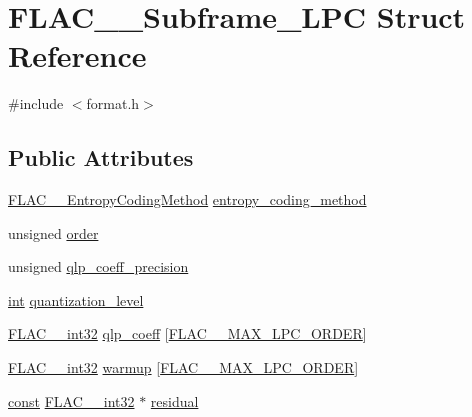 \hypertarget{struct_f_l_a_c_____subframe___l_p_c}{}\section{F\+L\+A\+C\+\_\+\+\_\+\+Subframe\+\_\+\+L\+PC Struct Reference}
\label{struct_f_l_a_c_____subframe___l_p_c}


{\ttfamily \#include $<$format.\+h$>$}

\subsection*{Public Attributes}
\begin{DoxyCompactItemize}
\item 
\hyperlink{struct_f_l_a_c_____entropy_coding_method}{F\+L\+A\+C\+\_\+\+\_\+\+Entropy\+Coding\+Method} \hyperlink{struct_f_l_a_c_____subframe___l_p_c_adb1401b2f8af05132420145a99f68c6e}{entropy\+\_\+coding\+\_\+method}
\item 
unsigned \hyperlink{struct_f_l_a_c_____subframe___l_p_c_a0de317accaf8a9f86194f97c378b2f86}{order}
\item 
unsigned \hyperlink{struct_f_l_a_c_____subframe___l_p_c_a6123b031203f603eba966b95fd2ad855}{qlp\+\_\+coeff\+\_\+precision}
\item 
\hyperlink{xmltok_8h_a5a0d4a5641ce434f1d23533f2b2e6653}{int} \hyperlink{struct_f_l_a_c_____subframe___l_p_c_aedcf1a3e5e62485e7ce250eda1f3e588}{quantization\+\_\+level}
\item 
\hyperlink{ordinals_8h_a33fd77bfe6d685541a0c034a75deccdc}{F\+L\+A\+C\+\_\+\+\_\+int32} \hyperlink{struct_f_l_a_c_____subframe___l_p_c_ad0b37ee925e2124a37fe3a513d5410b8}{qlp\+\_\+coeff} \mbox{[}\hyperlink{group__flac__format_ga16108d413f524329f338cff6e05f3aff}{F\+L\+A\+C\+\_\+\+\_\+\+M\+A\+X\+\_\+\+L\+P\+C\+\_\+\+O\+R\+D\+ER}\mbox{]}
\item 
\hyperlink{ordinals_8h_a33fd77bfe6d685541a0c034a75deccdc}{F\+L\+A\+C\+\_\+\+\_\+int32} \hyperlink{struct_f_l_a_c_____subframe___l_p_c_a91c6c71c6fc2b812da1d2a3761e29807}{warmup} \mbox{[}\hyperlink{group__flac__format_ga16108d413f524329f338cff6e05f3aff}{F\+L\+A\+C\+\_\+\+\_\+\+M\+A\+X\+\_\+\+L\+P\+C\+\_\+\+O\+R\+D\+ER}\mbox{]}
\item 
\hyperlink{getopt1_8c_a2c212835823e3c54a8ab6d95c652660e}{const} \hyperlink{ordinals_8h_a33fd77bfe6d685541a0c034a75deccdc}{F\+L\+A\+C\+\_\+\+\_\+int32} $\ast$ \hyperlink{struct_f_l_a_c_____subframe___l_p_c_acae4d0d439ea8900c5771eb967aec9bf}{residual}
\end{DoxyCompactItemize}



